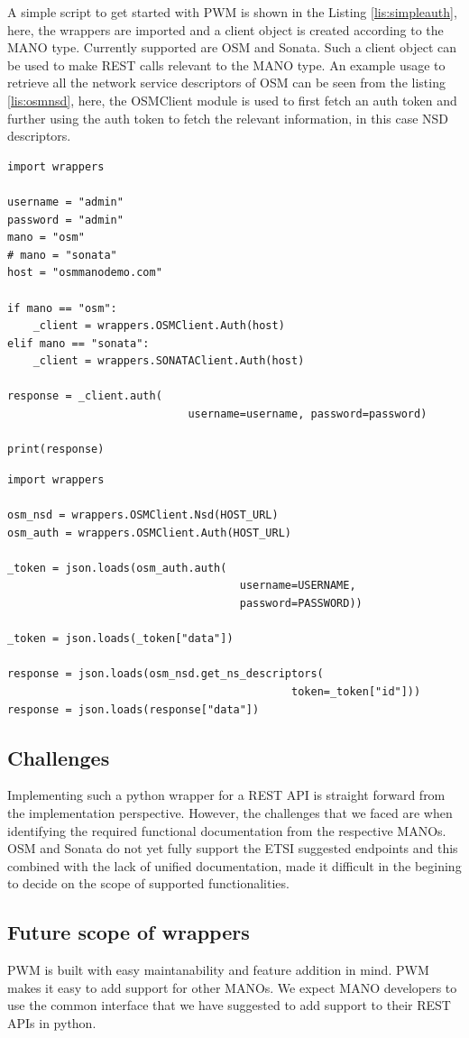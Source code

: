 A simple script to get started with PWM is shown in the Listing \ref{lis:simpleauth}, here, the wrappers are imported and a client object is created according to the MANO type. 
Currently supported are OSM and Sonata. 
Such a client object can be used to make REST calls relevant to the MANO type. 
An example usage to retrieve all the network service descriptors of OSM can be seen from the listing \ref{lis:osmnsd}, here, the OSMClient module is used to first fetch an auth token and further using the auth token to fetch the relevant information, in this case NSD descriptors.


\begin{lstlisting}[caption=Simple wrapper code to fetch token, label=lis:simpleauth]
import wrappers

username = "admin"
password = "admin"
mano = "osm"
# mano = "sonata"
host = "osmmanodemo.com"

if mano == "osm":
	_client = wrappers.OSMClient.Auth(host)
elif mano == "sonata":
	_client = wrappers.SONATAClient.Auth(host)

response = _client.auth(
							username=username, password=password)

print(response)

\end{lstlisting}

\begin{lstlisting}[caption=Code to fetch all NSDs in OSM, label=lis:osmnsd]
import wrappers

osm_nsd = wrappers.OSMClient.Nsd(HOST_URL)
osm_auth = wrappers.OSMClient.Auth(HOST_URL)

_token = json.loads(osm_auth.auth(
									username=USERNAME,
									password=PASSWORD))

_token = json.loads(_token["data"])

response = json.loads(osm_nsd.get_ns_descriptors(
											token=_token["id"]))
response = json.loads(response["data"])
\end{lstlisting}

\subsection{Challenges}

Implementing such a python wrapper for a REST API is straight forward from the implementation perspective. 
However, the challenges that we faced are when identifying the required functional documentation from the respective MANOs. 
OSM and Sonata do not yet fully support the ETSI suggested endpoints and this combined with the lack of unified documentation, made it difficult in the begining to decide on the scope of supported functionalities.\\
  

\subsection{Future scope of wrappers}

PWM is built with easy maintanability and feature addition in mind. 
PWM makes it easy to add support for other MANOs. 
We expect MANO developers to use the common interface that we have suggested to add support to their REST APIs in python.

 
